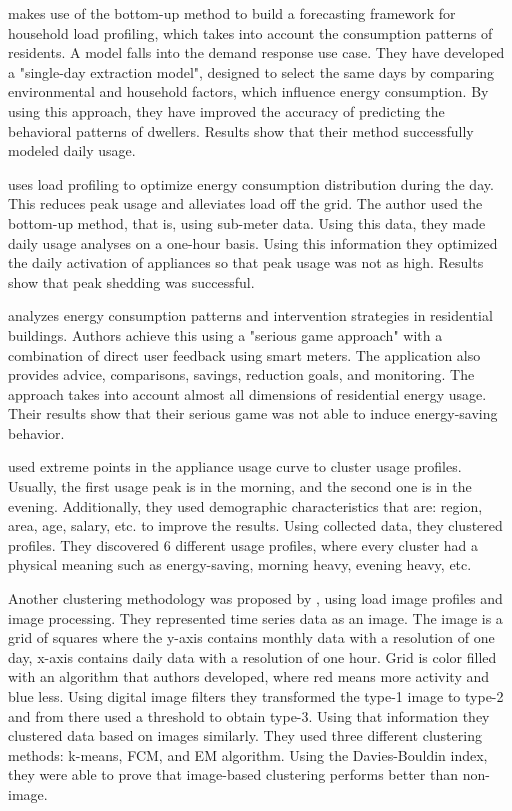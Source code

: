 \cite{Gao2018} makes use of the bottom-up method to build a forecasting framework for household
load profiling, which takes into account the consumption patterns of residents. 
A model falls into the demand response use case.
They have developed a "single-day extraction model", designed to select the same days by comparing environmental and household factors, which influence energy consumption.
By using this approach, they have improved the accuracy of predicting the behavioral patterns of dwellers. 
Results show that their method successfully modeled daily usage.

\cite{Chuan2014} uses load profiling to optimize energy consumption distribution during the day.
This reduces peak usage and alleviates load off the grid. The author used the bottom-up method, that is, using sub-meter data.
Using this data, they made daily usage analyses on a one-hour basis. Using this information they optimized the daily activation of appliances
so that peak usage was not as high. Results show that peak shedding was successful. 

\cite{Csoknyai2019} analyzes energy consumption patterns and intervention strategies in residential buildings.
Authors achieve this using a "serious game approach" with a combination of direct user feedback using smart meters. 
The application also provides advice, comparisons, savings, reduction goals, and monitoring.
The approach takes into account almost all dimensions of residential energy usage. Their results show that their serious game was not
able to induce energy-saving behavior.

\cite{Jeong2021} used extreme points in the appliance usage curve to cluster usage profiles.
Usually, the first usage peak is in the morning, and the second one is in the evening. 
Additionally, they used demographic characteristics that are: region, area, age, salary, etc. to improve the results.
Using collected data, they clustered profiles. They discovered 6 different usage profiles, 
where every cluster had a physical meaning such as energy-saving, morning heavy, evening heavy, etc.

Another clustering methodology was proposed by \cite{Park2019}, using load image profiles and image processing.
They represented time series data as an image. The image is a grid of squares where the y-axis contains monthly data with a resolution of one day,
x-axis contains daily data with a resolution of one hour. Grid is color filled with an algorithm that authors developed,
where red means more activity and blue less. Using digital image filters they transformed the type-1 image to type-2 and from there
used a threshold to obtain type-3. Using that information they clustered data based on images similarly. They used three different 
clustering methods: k-means, FCM, and EM algorithm. Using the Davies-Bouldin index, they were able to prove that image-based clustering performs better than non-image.


